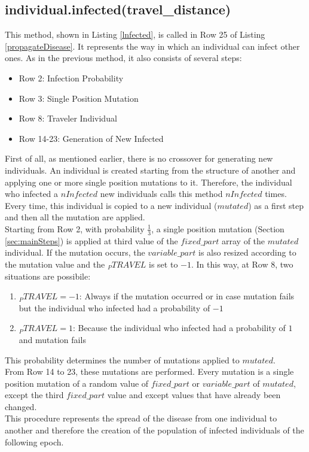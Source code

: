 \documentclass[letterpaper]{article}%
\begin{document}
\subsection{individual.infected(travel\_distance)}
This method, shown in Listing \ref{lnfected}, is called in Row 25 of Listing \ref{propagateDisease}. It represents the way in which an individual can infect other ones. As in the previous method, it also consists of several steps:
\begin{itemize}
\item Row 2: Infection Probability
\item Row 3: Single Position Mutation
\item Row 8: Traveler Individual
\item Row 14-23: Generation of New Infected
\end{itemize}
First of all, as mentioned earlier, there is no crossover for generating new individuals. An individual is created starting from the structure of another and applying one or more single position mutations to it. Therefore, the individual who infected a $nInfected$ new individuals calls this method $nInfected$ times. Every time, this individual is copied to a new individual ($mutated$) as a first step and then all the mutation are applied.\\
Starting from Row 2, with probability $\frac{1}{3}$, a single position mutation (Section \ref{sec:mainSteps}) is applied at third value of the $fixed\_part$ array of the $mutated$ individual. If the mutation occurs, the $variable\_part$ is also resized according to the mutation value and the $_PTRAVEL$ is set to $-1$.
In this way, at Row 8, two situations are possibile:
\begin{enumerate}[label=\arabic*)]
\item $_PTRAVEL = -1$: Always if the mutation occurred or in case mutation fails but the individual who infected had a probability of $-1$ 
\item $_PTRAVEL = 1$: Because the individual who infected had a probability of $1$ and mutation fails 
\end{enumerate}
This probability determines the number of mutations applied to $mutated$.\\
From Row 14 to 23, these mutations are performed. Every mutation is a single position mutation of a random value of $fixed\_part$ or $variable\_part$ of $mutated$, except the third $fixed\_part$ value and except values that have already been changed.\\
This procedure represents the spread of the disease from one individual to another and therefore the creation of the population of infected individuals of the following epoch.
\end{document}
